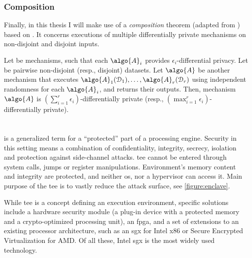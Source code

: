 			\subsubsection{Composition}

				Finally, in this thesis I will make use of a \emph{composition} theorem (adapted from \cite{privacy-integrated-queries}) based on \cite{differential-privacy-original,our-data-ourselves}. %
				It concerns executions of multiple differentially private mechanisms on non-disjoint and disjoint inputs.

				\begin{theorem}\label{theorem:composition}
					Let  be mechanisms, such that each $\algo{A}_i$ provides $\epsilon_i$-differential privacy.
					Let  be pairwise non-disjoint (resp., disjoint) datasets.
					Let $\algo{A}$ be another mechanism that executes $\algo{A}_1(\database_1), \ldots, \algo{A}_r(\database_r)$ using independent randomness for each $\algo{A}_i$, and returns their outputs.
					Then, mechanism $\algo{A}$ is $\left( \sum_{i=1}^r \epsilon_i \right)$-differentially private (resp., $\left( \max_{i=1}^r \epsilon_i \right)$-differentially private).
				\end{theorem}

	\section{\texorpdfstring{}{Trusted Execution Environments}}

		 is a generalized term for a ``protected'' part of a processing engine.
		Security in this setting means a combination of confidentiality, integrity, secrecy, isolation and protection against side-channel attacks.
		\acrshort{tee} cannot be entered through system calls, jumps or register manipulations.
		Environment's memory content and integrity are protected, and neither \acrshort{os}, nor a hypervisor can access it.
		Main purpose of the \acrshort{tee} is to vastly reduce the attack surface, see \cref{figure:enclave}.

		

		While \acrshort{tee} is a concept defining an execution environment, specific solutions include a hardware security module (a plug-in device with a protected memory and a crypto-optimized processing unit), an \acrshort{fpga}, and a set of extensions to an existing processor architecture, such as an \acrshort{sgx} for Intel x86 or Secure Encrypted Virtualization \cite{amd-memory-encryption} for AMD\@.
		Of all these, Intel \acrshort{sgx} is the most widely used technology.

